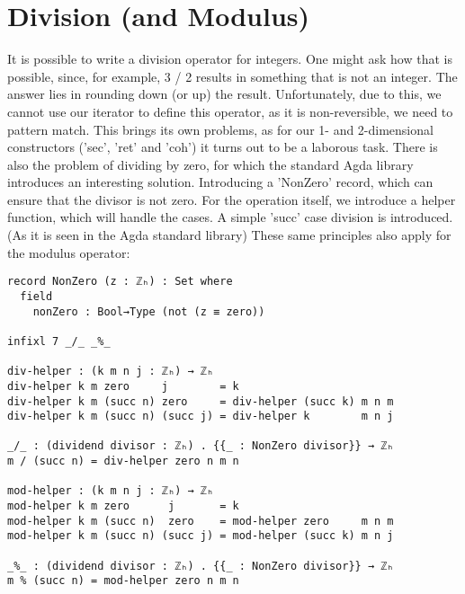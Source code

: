 \section{Division (and Modulus)}
It is possible to write a division operator for integers. One might ask how that is possible, since, for example, 3 / 2 results in something that is not an integer. The answer lies in rounding down (or up) the result. Unfortunately, due to this, we cannot use our iterator to define this operator, as it is non-reversible, we need to pattern match.
This brings its own problems, as for our 1- and 2-dimensional constructors ('sec', 'ret' and 'coh') it turns out to be a laborous task.
There is also the problem of dividing by zero, for which the standard Agda library introduces an interesting solution. Introducing a 'NonZero' record, which can ensure that the divisor is not zero.
For the operation itself, we introduce a helper function, which will handle the cases. A simple 'succ' case division is introduced. (As it is seen in the Agda standard library\cite{div-nat})
These same principles also apply for the modulus operator:
\begin{verbatim}
record NonZero (z : ℤₕ) : Set where
  field
    nonZero : Bool→Type (not (z ≡ zero))

infixl 7 _/_ _%_

div-helper : (k m n j : ℤₕ) → ℤₕ
div-helper k m zero     j        = k
div-helper k m (succ n) zero     = div-helper (succ k) m n m
div-helper k m (succ n) (succ j) = div-helper k        m n j

_/_ : (dividend divisor : ℤₕ) . {{_ : NonZero divisor}} → ℤₕ
m / (succ n) = div-helper zero n m n

mod-helper : (k m n j : ℤₕ) → ℤₕ
mod-helper k m zero      j       = k
mod-helper k m (succ n)  zero    = mod-helper zero     m n m
mod-helper k m (succ n) (succ j) = mod-helper (succ k) m n j

_%_ : (dividend divisor : ℤₕ) . {{_ : NonZero divisor}} → ℤₕ
m % (succ n) = mod-helper zero n m n
\end{verbatim}

